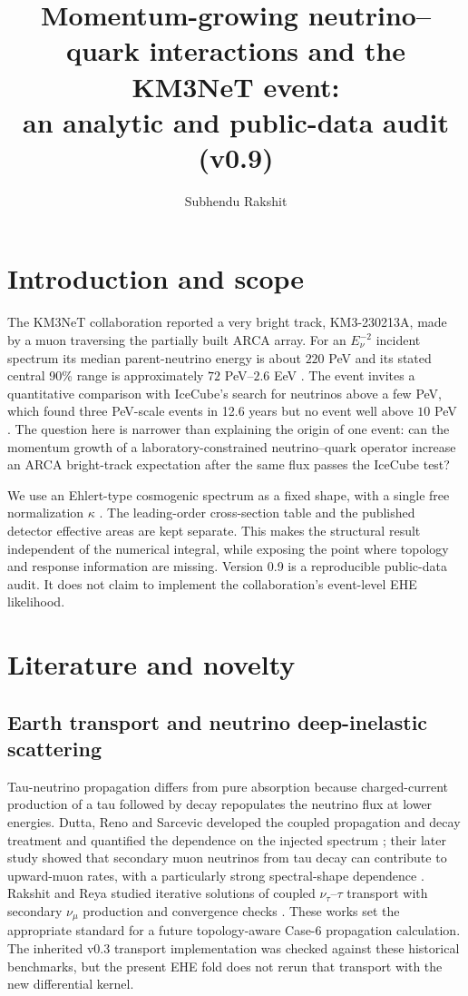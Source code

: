 \documentclass[11pt,a4paper]{article}
\title{Momentum-growing neutrino--quark interactions and the KM3NeT event:\\
an analytic and public-data audit (v0.9)}
\author{Subhendu Rakshit}
\begin{document}
\maketitle
\flushbottom
\tableofcontents

\section{Introduction and scope}
The KM3NeT collaboration reported a very bright track, KM3-230213A, made
by a muon traversing the partially built ARCA array.  For an $E_\nu^{-2}$
incident spectrum its median parent-neutrino energy is about $220$ PeV and
its stated central 90\% range is approximately $72$ PeV--$2.6$ EeV
\cite{KM3NeT:2025Nature}.  The event invites a quantitative comparison with
IceCube's search for neutrinos above a few PeV, which found three PeV-scale
events in 12.6 years but no event well above $10$ PeV
\cite{IceCube:2025EHE}.  The question here is narrower than explaining the
origin of one event: can the momentum growth of a laboratory-constrained
neutrino--quark operator increase an ARCA bright-track expectation after the
same flux passes the IceCube test?

We use an Ehlert-type cosmogenic spectrum as a fixed shape, with a single
free normalization $\kappa$ \cite{Ehlert:2024}.  The leading-order
cross-section table and the published detector effective areas are kept
separate.  This makes the structural result independent of the numerical
integral, while exposing the point where topology and response information
are missing.  Version 0.9 is a reproducible public-data audit.  It does not
claim to implement the collaboration's event-level EHE likelihood.

\section{Literature and novelty}
\subsection{Earth transport and neutrino deep-inelastic scattering}
Tau-neutrino propagation differs from pure absorption because charged-current
production of a tau followed by decay repopulates the neutrino flux at lower
energies.  Dutta, Reno and Sarcevic developed the coupled propagation and
decay treatment and quantified the dependence on the injected spectrum
\cite{Dutta:2000}; their later study showed that secondary muon neutrinos from
tau decay can contribute to upward-muon rates, with a particularly strong
spectral-shape dependence \cite{Dutta:2002}.  Rakshit and Reya studied
iterative solutions of coupled $\nu_\tau$--$\tau$ transport with secondary
$\nu_\mu$ production and convergence checks \cite{Rakshit:2006}.  These
works set the appropriate standard for a future topology-aware Case-6
propagation calculation.  The inherited v0.3 transport implementation was
checked against these historical benchmarks, but the present EHE fold does
not rerun that transport with the new differential kernel.
\end{document}
